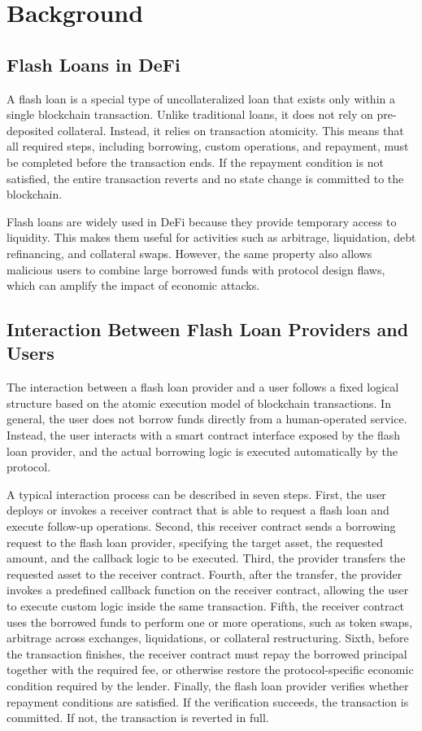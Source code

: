 \section{Background}

\subsection{Flash Loans in DeFi}

A flash loan is a special type of uncollateralized loan that exists only within a single blockchain transaction. Unlike traditional loans, it does not rely on pre-deposited collateral. Instead, it relies on transaction atomicity. This means that all required steps, including borrowing, custom operations, and repayment, must be completed before the transaction ends. If the repayment condition is not satisfied, the entire transaction reverts and no state change is committed to the blockchain.

Flash loans are widely used in DeFi because they provide temporary access to liquidity. This makes them useful for activities such as arbitrage, liquidation, debt refinancing, and collateral swaps. However, the same property also allows malicious users to combine large borrowed funds with protocol design flaws, which can amplify the impact of economic attacks.

\subsection{Interaction Between Flash Loan Providers and Users}

The interaction between a flash loan provider and a user follows a fixed logical structure based on the atomic execution model of blockchain transactions. In general, the user does not borrow funds directly from a human-operated service. Instead, the user interacts with a smart contract interface exposed by the flash loan provider, and the actual borrowing logic is executed automatically by the protocol.

A typical interaction process can be described in seven steps. First, the user deploys or invokes a receiver contract that is able to request a flash loan and execute follow-up operations. Second, this receiver contract sends a borrowing request to the flash loan provider, specifying the target asset, the requested amount, and the callback logic to be executed. Third, the provider transfers the requested asset to the receiver contract. Fourth, after the transfer, the provider invokes a predefined callback function on the receiver contract, allowing the user to execute custom logic inside the same transaction. Fifth, the receiver contract uses the borrowed funds to perform one or more operations, such as token swaps, arbitrage across exchanges, liquidations, or collateral restructuring. Sixth, before the transaction finishes, the receiver contract must repay the borrowed principal together with the required fee, or otherwise restore the protocol-specific economic condition required by the lender. Finally, the flash loan provider verifies whether repayment conditions are satisfied. If the verification succeeds, the transaction is committed. If not, the transaction is reverted in full.

